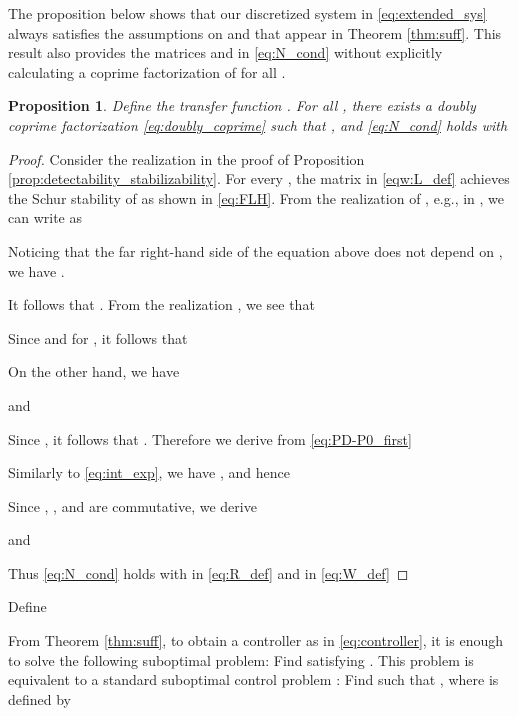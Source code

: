 \documentclass[letterpaper, 12pt, draftcls, onecolumn]{ieeeconf}
\newtheorem{proposition}[theorem]{Proposition}
\begin{document}
The proposition below shows that our discretized system  in \eqref{eq:extended_sys}
always satisfies
the assumptions on  and 
that appear in Theorem \ref{thm:suff}. 
This result also provides the matrices  and  in \eqref{eq:N_cond}
without explicitly calculating a coprime factorization of  
for all .
\begin{proposition}
	\label{prop:DN_cond}
Define the transfer function .
	For all ,
	there exists a doubly coprime factorization \eqref{eq:doubly_coprime}
	such that ,
and 
	\eqref{eq:N_cond} holds with
	
\end{proposition}
\begin{proof}
	Consider the realization  in
	the proof of 
	Proposition \ref{prop:detectability_stabilizability}.
	For every ,
	the matrix  in \eqref{eqw:L_def}
	achieves the Schur stability of
	 as shown in \eqref{eq:FLH}.
	From the realization of , e.g., in
	\cite[Theorem 4.2.1]{vidyasagar1985},
	we can write
	 as
	
Noticing that the far right-hand side of the equation above
	does not depend on ,
	we have .
	
	It follows that . 
	From the realization ,
	we see that
	
	Since  and  for ,
	it follows that

	
	On the other hand,
	we have

and
	
	Since ,
	it follows that .
	Therefore we derive from \eqref{eq:PD-P0_first}
	
	Similarly to \eqref{eq:int_exp}, we have
	,
and hence

Since , , and 
	are commutative, we derive 
	
	and 

Thus \eqref{eq:N_cond} holds with
	 in \eqref{eq:R_def} and
	 in \eqref{eq:W_def}
	\hspace*{\fill}  
\end{proof}

Define 

From Theorem \ref{thm:suff}, to obtain a controller  as in  \eqref{eq:controller},
it is enough to solve the following suboptimal problem:
Find  satisfying
.
This problem is equivalent to a standard suboptimal  control problem
\cite[Chaps.~16,~17]{zhou1996}:
Find  such that 
, where  is defined by
\end{document}
